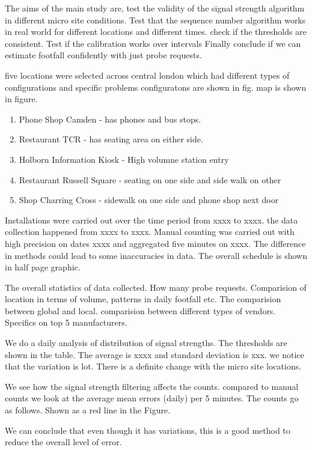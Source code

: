 The aims of the main study are,
test the validity of the signal strength algorithm in different 
micro site conditions.
Test that the sequence number algorithm works in real world
for different locations and different times.
check if the thresholds are consistent.
Test if the calibration works over intervals
Finally conclude if we can estimate footfall confidently
with just probe requests.

five locations were selected across central london which
had different types of configurations and specific problems
configuratons are shown in fig. map is shown in figure.
\begin{enumerate}
	\item Phone Shop Camden - has phones and bus stops.
	\item Restaurant TCR - has seating area on either side.
	\item Holborn Information Kiosk - High volumne station entry
	\item Restaurant Russell Square - seating on one side and side walk on other
	\item Shop Charring Cross - sidewalk on one side and phone shop next door
\end{enumerate}
Installations were carried out over the time period from xxxx to xxxx.
the data collection happened from xxxx to xxxx. Manual counting was carried out
with high precision on dates xxxx and aggregated five minutes on xxxx.
The difference in methods could lead to some inaccuracies in data.
The overall schedule is shown in half page graphic.

The overall statistics of data collected. How many probe requests.
Comparision of location in terms of volume, patterns in daily footfall etc.
The comparision between global and local.
comparision between different types of vendors.
Specifics on top 5 manufacturers.

We do a daily analysis of distribution of signal strengths.
The thresholds are shown in the table.
The average is xxxx and standard deviation is xxx.
we notice that the variation is lot. There is a definite
change with the micro site locations.

We see how the signal strength filtering affects the counts.
compared to manual counts we look at the average mean errors (daily)
per 5 minutes. The counts go as follows.
Shown as a red line in the Figure.

We can conclude that even though it has variations, this is
a good method to reduce the overall level of error.

